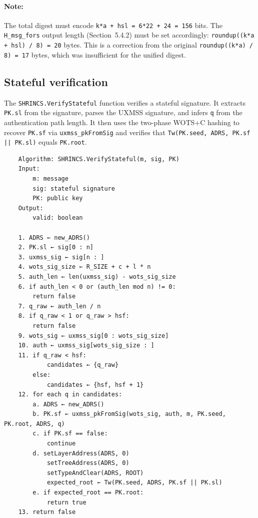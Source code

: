 \paragraph{Note:} The total digest must encode \texttt{k*a + hsl = 6*22 + 24 = 156} bits. The \texttt{H\_msg\_fors} output length (Section~5.4.2) must be set accordingly: \texttt{roundup((k*a + hsl) / 8) = 20} bytes. This is a correction from the original \texttt{roundup((k*a) / 8) = 17} bytes, which was insufficient for the unified digest.

\subsection{Stateful verification}
The \texttt{SHRINCS.VerifyStateful} function verifies a stateful signature. It extracts \texttt{PK.sl} from the signature, parses the UXMSS signature, and infers \texttt{q} from the authentication path length. It then uses the two-phase WOTS+C hashing to recover \texttt{PK.sf} via \texttt{uxmss\_pkFromSig} and verifies that \texttt{Tw(PK.seed, ADRS, PK.sf || PK.sl)} equals \texttt{PK.root}.
\begin{verbatim}
    Algorithm: SHRINCS.VerifyStateful(m, sig, PK)
    Input:
        m: message
        sig: stateful signature
        PK: public key
    Output:
        valid: boolean

    1. ADRS ← new_ADRS()
    2. PK.sl ← sig[0 : n]
    3. uxmss_sig ← sig[n : ]
    4. wots_sig_size ← R_SIZE + c + l * n
    5. auth_len ← len(uxmss_sig) - wots_sig_size
    6. if auth_len < 0 or (auth_len mod n) != 0:
        return false
    7. q_raw ← auth_len / n
    8. if q_raw < 1 or q_raw > hsf:
        return false
    9. wots_sig ← uxmss_sig[0 : wots_sig_size]
    10. auth ← uxmss_sig[wots_sig_size : ]
    11. if q_raw < hsf:
            candidates ← {q_raw}
        else:
            candidates ← {hsf, hsf + 1}
    12. for each q in candidates:
        a. ADRS ← new_ADRS()
        b. PK.sf ← uxmss_pkFromSig(wots_sig, auth, m, PK.seed, PK.root, ADRS, q)
        c. if PK.sf == false:
            continue
        d. setLayerAddress(ADRS, 0)
            setTreeAddress(ADRS, 0)
            setTypeAndClear(ADRS, ROOT)
            expected_root ← Tw(PK.seed, ADRS, PK.sf || PK.sl)
        e. if expected_root == PK.root:
            return true
    13. return false
\end{verbatim}

